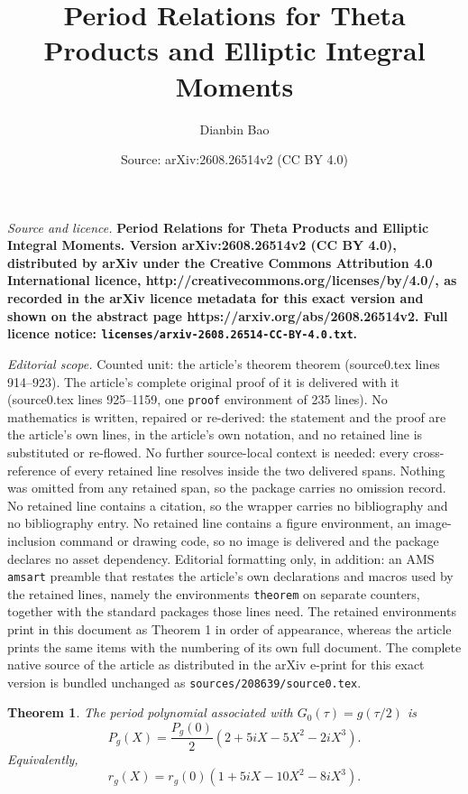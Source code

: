 \documentclass[10pt,a4paper]{amsart}
\title{\bfseries Period Relations for Theta Products and Elliptic Integral Moments}
\author{Dianbin Bao}
\date{Source: arXiv:2608.26514v2 (CC BY 4.0)}
\newtheorem{theorem}{Theorem}
\begin{document}
\maketitle

\noindent\emph{Source and licence.} \bfseries Period Relations for Theta Products and Elliptic Integral Moments. Version arXiv:2608.26514v2 (CC BY 4.0), distributed by arXiv under the Creative Commons Attribution 4.0 International licence, http://creativecommons.org/licenses/by/4.0/, as recorded in the arXiv licence metadata for this exact version and shown on the abstract page https://arxiv.org/abs/2608.26514v2. Full licence notice: \texttt{licenses/arxiv-2608.26514-CC-BY-4.0.txt}.\par\smallskip

\noindent\textit{Editorial scope.} Counted unit: the article's theorem theorem (source0.tex lines 914--923). The article's complete original proof of it is delivered with it (source0.tex lines 925--1159, one \texttt{proof} environment of 235 lines). No mathematics is written, repaired or re-derived: the statement and the proof are the article's own lines, in the article's own notation, and no retained line is substituted or re-flowed.  No further source-local context is needed: every cross-reference of every retained line resolves inside the two delivered spans.  Nothing was omitted from any retained span, so the package carries no omission record.  No retained line contains a citation, so the wrapper carries no bibliography and no bibliography entry.  No retained line contains a figure environment, an image-inclusion command or drawing code, so no image is delivered and the package declares no asset dependency.  Editorial formatting only, in addition: an AMS \texttt{amsart} preamble that restates the article's own declarations and macros used by the retained lines, namely the environments \texttt{theorem} on separate counters, together with the standard packages those lines need.  The retained environments print in this document as Theorem 1 in order of appearance, whereas the article prints the same items with the numbering of its own full document.  The complete native source of the article as distributed in the arXiv e-print for this exact version is bundled unchanged as \texttt{sources/208639/source0.tex}.
\begin{theorem}
	The period polynomial associated with $G_0(\tau)=g(\tau/2)$ is
	\[
	P_g(X)=\frac{P_g(0)}{2}\left(2+5iX-5X^2-2iX^3\right).
	\]
	Equivalently,
	\[
	r_g(X)=r_g(0)\left(1+5iX-10X^2-8iX^3\right).
	\]
\end{theorem}
\end{document}
